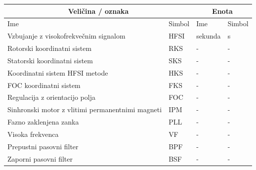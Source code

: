\documentclass[a4paper,twoside,openright,12pt,slovene]{book}
\begin{document}
\begin{center}
    \begin{tabular}{*{4}{l}} \hline
        \multicolumn{2}{c}{\bf{Veličina / oznaka}}           & \multicolumn{2}{c}{\bf{Enota}} \\ \hline
        Ime                                                        & Simbol                                 & Ime                  & Simbol                 \\ \hline
        Vzbujanje z visokofrekvečnim signalom                      & HFSI                                   & sekunda              & s                      \\
        Rotorski koordinatni sistem                                & RKS                                    & -                    & -                      \\
        Statorski koordinatni sistem                               & SKS                                    & -                    & -                      \\
        Koordinatni sistem HFSI metode                             & HKS                                    & -                    & -                      \\
        FOC koordinatni sistem                                     & FKS                                    & -                    & -                      \\
        Regulacija z orientacijo polja                             & FOC                                    & -                    & -                      \\
        Sinhronski motor z vlitimi permanentnimi magneti           & IPM                                    & -                    & -                      \\
        Fazno zaklenjena zanka                                     & PLL                                    & -                    & -                      \\
        Visoka frekvenca                                           & VF                                     & -                    & -                      \\
        Prepustni pasovni filter                                   & BPF                                    & -                    & -                      \\
        Zaporni pasovni filter                                     & BSF                                    & -                    & -                      \\

\end{tabular}
\end{center}
\end{document}

